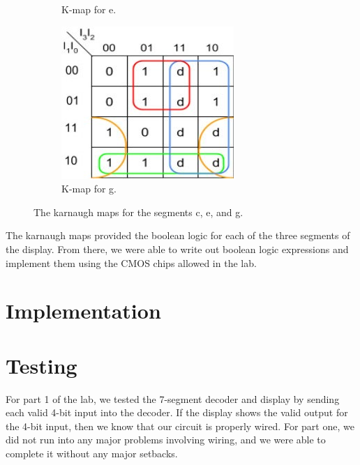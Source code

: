 \documentclass{article}
\begin{document}
\begin{figure}[h!]
\begin{mdframed}
\begin{subfigure}[b]{0.3\linewidth}
    \caption{K-map for e.}
  \end{subfigure}
  \begin{subfigure}[b]{0.3\linewidth}
    \includegraphics[width=\linewidth]{g_kmap.jpg}
    \caption{K-map for g.}
  \end{subfigure}
  \end{mdframed}
  \caption{The karnaugh maps for the segments c, e, and g.}
\end{figure}

The karnaugh maps provided the boolean logic for each of the three
segments of the display. From there, we were able to write out boolean
logic expressions and implement them using the CMOS chips allowed in
the lab.


\section{Implementation}




\section{Testing}

For part 1 of the lab, we tested the 7-segment decoder and display
by sending each valid 4-bit input into the decoder. If the display
shows the valid output for the 4-bit input, then we know that our
circuit is properly wired. For part one, we did not run into any major
problems involving wiring, and we were able to complete it without any
major setbacks.
\end{document}
